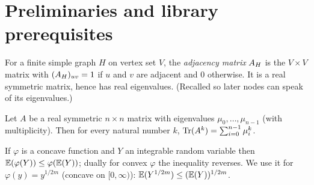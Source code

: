 %

\chapter{Preliminaries and library prerequisites}


\begin{definition}
  \label{def:adj-matrix}
  \mathlibok
  For a finite simple graph $H$ on vertex set $V$, the \emph{adjacency matrix}
  $A_H$ is the $V \times V$ matrix with $(A_H)_{uv} = 1$ if $u$ and $v$
  are adjacent and $0$ otherwise. It is a real symmetric matrix, hence has real
  eigenvalues. (Recalled so later nodes can speak of its eigenvalues.)
\end{definition}

\begin{lemma}
  \label{lem:trace-pow-eig}
  \mathlibok
  Let $A$ be a real symmetric $n \times n$ matrix with eigenvalues
  $\mu_0, \dots, \mu_{n-1}$ (with multiplicity). Then for every natural number
  $k$, $\operatorname{Tr}(A^{k}) = \sum_{i=0}^{n-1} \mu_i^{k}$.
\end{lemma}

\begin{lemma}
  \label{lem:jensen}
  \mathlibok
  If $\varphi$ is a concave function and $Y$ an integrable random variable then
  $\mathbb{E}(\varphi(Y)) \le \varphi(\mathbb{E}(Y))$; dually for convex $\varphi$ the
  inequality reverses. We use it for $\varphi(y) = y^{1/2m}$ (concave on
  $[0,\infty)$): $\mathbb{E}(Y^{1/2m}) \le (\mathbb{E}(Y))^{1/2m}$.
\end{lemma}

